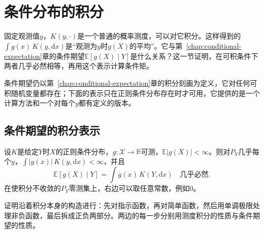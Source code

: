 \section{条件分布的积分}
\label{sec:cdis-integration}

固定观测值$y$，$K(y,\cdot)$是一个普通的概率测度，可以对它积分。这样得到的$\int g(x)\,K(y,\mathrm{d}x)$是“观测为$y$时$g(X)$的平均”。它与第~\ref{chap:conditional-expectation}章的条件期望$\mathbb{E}[g(X)\mid Y]$是什么关系？这一节证明，在可积条件下两者几乎必然相等，再用这个表示计算条件矩。

条件期望仍以第~\ref{chap:conditional-expectation}章的积分刻画为定义，它对任何可积随机变量都存在；下面的表示只在正则条件分布存在时才可用，它提供的是一个计算方法和一个对每个$y$都有定义的版本。

\subsection{条件期望的积分表示}
\label{sec:cdis-integral-representation}

\begin{theorem}[条件期望的积分表示]
\label{thm:cdis-integral-representation}
设$K$是给定$Y$时$X$的正则条件分布，$g:\mathcal{X}\to\mathbb{R}$可测，$\mathbb{E}\lvert g(X)\rvert<\infty$。则对$P_Y$几乎每个$y$，$\int\lvert g(x)\rvert\,K(y,\mathrm{d}x)<\infty$，并且
\begin{equation}
 \mathbb{E}[g(X)\mid Y]=\int g(x)\,K(Y,\mathrm{d}x)\quad\text{几乎必然}.
 \label{eq:cdis-integral-representation}
\end{equation}
在使积分不收敛的$P_Y$零测集上，右边可以取任意常数，例如$0$。
\end{theorem}

证明沿着积分本身的构造进行：先对指示函数，再对简单函数，然后用单调极限处理非负函数，最后拆成正负两部分。两边的每一步分别用测度积分的性质与条件期望的性质。

